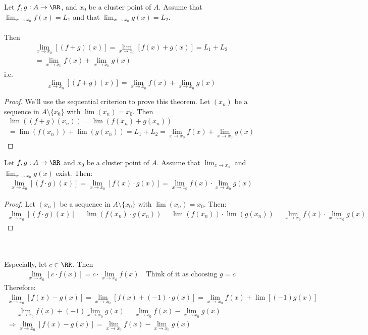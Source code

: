 \documentclass[class=scrartcl, crop=false]{standalone}
\begin{document}
\begin{theorem}
  Let $f, g : A \to \RR$, and $x_0$ be a cluster point of $A$. Assume that $\lim_{x \to x_0}f(x) = L_1$ and that $\lim_{x \to x_0} g(x) = L_2$.
  \\\\
  Then 
  \begin{gather*}
    \lim_{x \to x_0}[(f + g)(x)] = \lim_{x \to x_0} [f(x) + g(x)] = L_1 + L_2 \\
    = \lim_{x \to x_0}f(x) + \lim_{x \to x_0}g(x)
  \end{gather*} 
  i.e.
  \[
    \lim_{x \to x_0}[(f + g)(x)] = \lim_{x \to x_0}f(x) + \lim_{x \to x_0}g(x)
  \]
  \begin{proof}
    We'll use the sequential criterion to prove this theorem. Let $(x_n)$ be a sequence in $A \setminus \{x_0\}$ with $\lim(x_n) = x_0$. Then
    \begin{gather*}
      \lim((f + g)(x_n)) = \lim(f(x_n) + g(x_n)) \\
      = \lim(f(x_n)) + \lim(g(x_n)) = L_1 + L_2 = \lim_{x \to x_0}f(x) + \lim_{x \to x_0}g(x)
    \end{gather*} 
  \end{proof} 
\end{theorem} 
\begin{theorem}
  Let $f, g: A \to \RR$ and $x_0$ be a cluster point of $A$. Assume that $\lim_{x \to x_0}$ and $\lim_{x \to x_0}g(x)$ exist. Then:
  \begin{gather*}
    \lim_{x \to x_0}[(f \cdot g)(x)] = \lim_{x \to x_0}[f(x) \cdot g(x)] = \lim_{x \to x_0}f(x) \cdot \lim_{x \to x_0}g(x)
  \end{gather*} 
  \begin{proof}
    Let $(x_n)$ be a sequence in $A \setminus \{x_0\}$ with $\lim(x_n) = x_0$. Then:
    \begin{gather*}
      \lim_{x \to x_0}[(f \cdot g)(x)] = \lim(f(x_n) \cdot g(x_n)) = \lim(f(x_n)) \cdot \lim(g(x_n)) = \lim_{x \to x_0}f(x) \cdot \lim_{x \to x_0}g(x)
    \end{gather*} 
  \end{proof} \leavevmode \\\\ \noindent
  Especially, let $c \in \RR$. Then
  \begin{gather*}
    \lim_{x \to x_0}[c \cdot f(x)] = c \cdot \lim_{x \to x_0}f(x) \quad \text{Think of it as choosing $g = c$}
  \end{gather*} 
  Therefore:
  \begin{gather*}
    \lim_{x \to x_0}[f(x) - g(x)] = \lim_{x \to x_0}[f(x) + (-1) \cdot g(x)] = \lim_{x \to x_0} f(x) + \lim[(-1)g(x)] \\
    = \lim_{x \to x_0} f(x) + (-1) \lim_{x \to x_0} g(x) = \lim_{x \to x_0} f(x) - \lim_{x \to x_0} g(x) \\
    \Rightarrow \lim_{x \to x_0}[f(x) - g(x)] = \lim_{x \to x_0} f(x) - \lim_{x \to x_0}g(x)
  \end{gather*} 
\end{theorem} 
\end{document}
